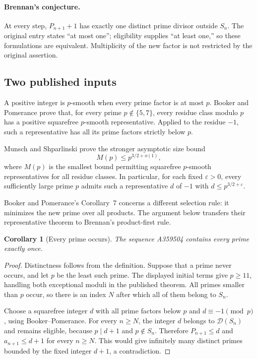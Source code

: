 \documentclass[11pt,a4paper]{article}
\newtheorem{corollary}[theorem]{Corollary}
\theoremstyle{definition}\newtheorem{definition}[theorem]{Definition}
\theoremstyle{remark}\newtheorem{remark}[theorem]{Remark}
\begin{document}
\paragraph{Brennan's conjecture.}
At every step, $P_{n+1}+1$ has exactly one distinct prime divisor outside
$S_n$.  The original entry states ``at most one''; eligibility supplies
``at least one,'' so these formulations are equivalent.  Multiplicity of
the new factor is not restricted by the original assertion.

\subsection{Two published inputs}

A positive integer is $p$-smooth when every prime factor is at most $p$.
Booker and Pomerance \cite[Theorem~1]{booker2017} prove that, for every prime
$p\notin\{5,7\}$, every residue class modulo $p$ has a positive squarefree
$p$-smooth representative.  Applied to the residue $-1$, such a representative
has all its prime factors strictly below $p$.

Munsch and Shparlinski \cite[Theorem~1.4]{munsch2020} prove the stronger
asymptotic size bound
\[
 M(p)\le p^{3/2+o(1)},
\]
where $M(p)$ is the smallest bound permitting squarefree $p$-smooth
representatives for all residue classes.  In particular, for each fixed
$\varepsilon>0$, every sufficiently large prime $p$ admits such a
representative $d$ of $-1$ with $d\le p^{3/2+\varepsilon}$.

Booker and Pomerance's Corollary~7 concerns a different selection rule: it
minimizes the new prime over all products.  The argument below transfers
their representative theorem to Brennan's product-first rule.

\begin{corollary}[Every prime occurs]
The sequence A359504 contains every prime exactly once.

\end{corollary}\begin{proof}
Distinctness follows from the definition.  Suppose that a prime never
occurs, and let $p$ be the least such prime.  The displayed initial terms
give $p\ge11$, handling both exceptional moduli in the published theorem.
All primes smaller than $p$ occur, so there is an index $N$ after which
all of them belong to $S_n$.

Choose a squarefree integer $d$ with all prime factors below $p$ and
$d\equiv-1\pmod p$, using Booker--Pomerance.  For every $n\ge N$, the
integer $d$ belongs to $\mathcal D(S_n)$ and remains eligible, because
$p\mid d+1$ and $p\notin S_n$.  Therefore $P_{n+1}\le d$ and
$a_{n+1}\le d+1$ for every $n\ge N$.  This would give infinitely many
distinct primes bounded by the fixed integer $d+1$, a contradiction.
\end{proof}
\end{document}
